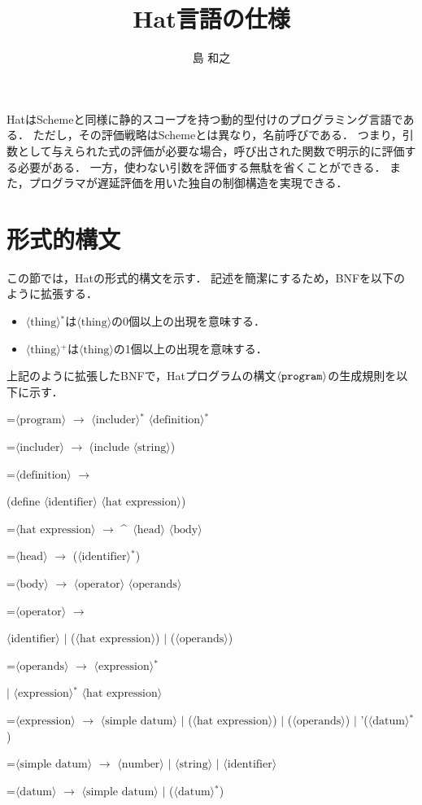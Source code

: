 \documentclass[twocolumn]{jarticle}
\def\hat{\mbox{\^{ }}}
\def\|{ $|$ \allowbreak}
\newcommand{\NT}[1]{\ensuremath{\langle\mbox{#1}\rangle}\allowbreak}
\newcommand{\lrto}{ \ensuremath{\rightarrow} \allowbreak}
\newenvironment{hang}[1][\parindent]
  {\def\item{\par\hangindent=#1\noindent}}
  {\par}
\begin{document}
\title{Hat言語の仕様}
\author{島 和之}
\maketitle

HatはSchemeと同様に静的スコープを持つ動的型付けのプログラミング言語である．
ただし，その評価戦略はSchemeとは異なり，名前呼びである．
つまり，引数として与えられた式の評価が必要な場合，呼び出された関数で明示的に評価する必要がある．
一方，使わない引数を評価する無駄を省くことができる．
また，プログラマが遅延評価を用いた独自の制御構造を実現できる．

\section{形式的構文}

この節では，Hatの形式的構文を示す．
記述を簡潔にするため，BNFを以下のように拡張する．
\begin{itemize}
\item\NT{thing}$^*$は\NT{thing}の0個以上の出現を意味する．
\item\NT{thing}$^+$は\NT{thing}の1個以上の出現を意味する．
\end{itemize}
上記のように拡張したBNFで，Hatプログラムの構文\NT{\tt program}の生成規則を以下に示す．
\begin{hang}\tt %
\item\NT{program}\lrto
  \NT{includer}$^*$ \NT{definition}$^*$
\item\NT{includer}\lrto
  (include \NT{string})
\item\NT{definition}\lrto\par
  (define \NT{identifier} \NT{hat expression})
\item\NT{hat expression}\lrto
  \hat\ \NT{head} \NT{body}
\item\NT{head}\lrto
  (\NT{identifier}$^*$)
\item\NT{body}\lrto
  \NT{operator} \NT{operands}
\item\NT{operator}\lrto\par
  \NT{identifier} \| (\NT{hat expression}) \| (\NT{operands})
\item\NT{operands}\lrto
  \NT{expression}$^*$\par
  \| \NT{expression}$^*$ \NT{hat expression}
\item\NT{expression}\lrto
  \NT{simple datum}
  \| (\NT{hat expression})
  \| (\NT{operands})
  \| '(\NT{datum}$^*$)
\item\NT{simple datum}\lrto
  \NT{number} \| \NT{string} \| \NT{identifier}
\item\NT{datum}\lrto
  \NT{simple datum}
  \| (\NT{datum}$^*$)
\end{hang}
\end{document}
